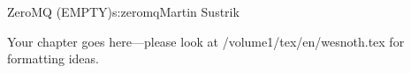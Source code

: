 \begin{aosachapter}{ZeroMQ (EMPTY)}{s:zeromq}{Martin Sustrik}

Your chapter goes here---please look at /volume1/tex/en/wesnoth.tex for 
formatting ideas.

\end{aosachapter}
